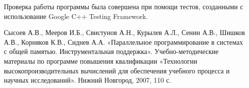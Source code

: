 \documentclass[12pt]{article}
\begin{document}
Проверка работы программы была совершена при помощи тестов, созданными с использование Google C++ Testing Framework.

\newpage
\newpage

\begin{thebibliography}{}
 Сысоев А.В., Мееров И.Б., Свистунов А.Н., Курылев А.Л., Сенин А.В., Шишков А.В., Корняков К.В., Сиднев А.А. «Параллельное программирование в системах с общей памятью. Инструментальная поддержка». Учебно-методические материалы по программе повышения квалификации «Технологии высокопроизводительных вычислений для обеспечения учебного процесса и научных исследований». Нижний Новгород, 2007, 110 с. 


\end{thebibliography}
\newpage
\end{document}

